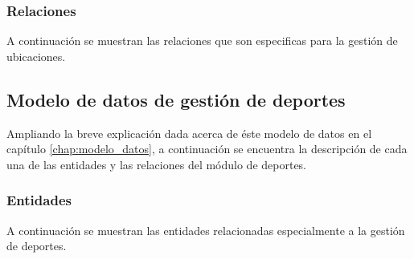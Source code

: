 \clearpage






\subsubsection{Relaciones}
A continuación se muestran las relaciones que son especificas para la gestión de ubicaciones.

\clearpage





\subsection{Modelo de datos de gestión de deportes}
Ampliando la breve explicación dada acerca de éste modelo de datos en el capítulo \ref{chap:modelo_datos}, a continuación se encuentra la descripción de cada una de las entidades y las relaciones del módulo de deportes.

\subsubsection{Entidades}
A continuación se muestran las entidades relacionadas especialmente a la gestión de deportes.

\clearpage













